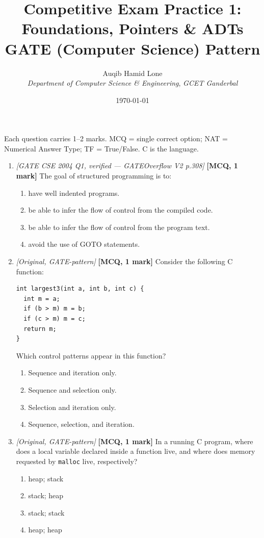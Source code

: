 \documentclass[11pt]{article}
\title{Competitive Exam Practice 1: Foundations, Pointers \& ADTs\\\large GATE (Computer Science) Pattern}
\author{Auqib Hamid Lone\\[0.3em]
  \emph{Department of Computer Science \& Engineering}, \emph{GCET Ganderbal}}
\date{\today}
\begin{document}
\maketitle

\noindent Each question carries 1--2 marks. MCQ = single correct option; NAT = Numerical Answer Type; TF = True/False. C is the language.

\begin{enumerate}
\item[\textbf{Q1}] \textit{[GATE CSE 2004 Q1, verified --- GATEOverflow V2 p.308]} \textbf{[MCQ, 1 mark]} The goal of structured programming is to:
\begin{enumerate}
  \item[(A)] have well indented programs.
  \item[(B)] be able to infer the flow of control from the compiled code.
  \item[(C)] be able to infer the flow of control from the program text.
  \item[(D)] avoid the use of GOTO statements.
\end{enumerate}

\item[\textbf{Q2}] \textit{[Original, GATE-pattern]} \textbf{[MCQ, 1 mark]} Consider the following C function:
\begin{verbatim}
int largest3(int a, int b, int c) {
  int m = a;
  if (b > m) m = b;
  if (c > m) m = c;
  return m;
}
\end{verbatim}
Which control patterns appear in this function?
\begin{enumerate}
  \item[(A)] Sequence and iteration only.
  \item[(B)] Sequence and selection only.
  \item[(C)] Selection and iteration only.
  \item[(D)] Sequence, selection, and iteration.
\end{enumerate}

\item[\textbf{Q3}] \textit{[Original, GATE-pattern]} \textbf{[MCQ, 1 mark]} In a running C program, where does a local variable declared inside a function live, and where does memory requested by \texttt{malloc} live, respectively?
\begin{enumerate}
  \item[(A)] heap; stack
  \item[(B)] stack; heap
  \item[(C)] stack; stack
  \item[(D)] heap; heap
\end{enumerate}


\end{enumerate}
\end{document}
